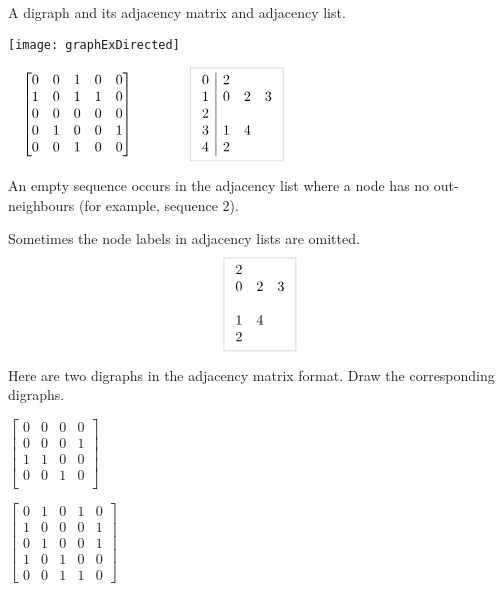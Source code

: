 \begin{Boxample}
A digraph and its adjacency matrix and adjacency list.\\
\begin{center}
\begin{minipage}[c]{0.3\textwidth}
\centering
\texttt{[image: graphExDirected]}
\end{minipage}
\begin{minipage}[c]{0.65\textwidth}
$\quad 
\left[
\begin{matrix}
0 & 0 & 1 & 0 & 0 \\
1 & 0 & 1 & 1 & 0 \\
0 & 0 & 0 & 0 & 0 \\
0 & 1 & 0 & 0 & 1 \\
0 & 0 & 1 & 0 & 0 
\end{matrix}
\right]
\qquad \qquad
\lightgraybox{
	\begin{array}{c|ccc}
	0 & 2  \\
	1 & 0 & 2 & 3  \\
	2  \\
	3 & 1 & 4  \\
	4 & 2 \\
	\end{array}
}
$
\end{minipage}
\end{center}
An empty sequence occurs in the adjacency list where a node has no out-neighbours (for example, sequence $2$). 
\end{Boxample}

Sometimes the node labels in adjacency lists are omitted.
$$
\lightgraybox{
	\begin{array}{ccc}
	2 &   &   \\
	0 & 2 & 3 \\
	  &   &   \\
	1 & 4 &   \\
	2 &   &   \\
	\end{array}
}
$$



\begin{Boxample}[2]
Here are two digraphs in the adjacency matrix format. Draw the corresponding digraphs.

\vspace{1.5cm}
$\left[
\begin{matrix}
0 & 0 & 0 & 0  \\
0 & 0 & 0 & 1  \\
1 & 1 & 0 & 0  \\
0 & 0 & 1 & 0  \\
\end{matrix}
\right]$

\vspace{2.5cm}
$\left[
\begin{matrix}
0 & 1 & 0 & 1 & 0 \\
1 & 0 & 0 & 0 & 1 \\
0 & 1 & 0 & 0 & 1 \\
1 & 0 & 1 & 0 & 0 \\
0 & 0 & 1 & 1 & 0 
\end{matrix}
\right]$
\end{Boxample}

